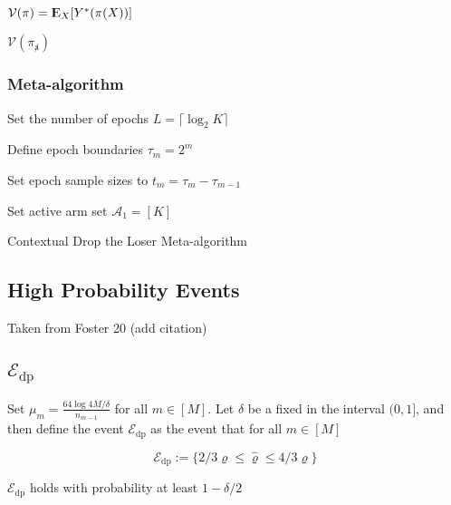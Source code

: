 \documentclass[12pt,,letterpaper,twoside]{report}
\DeclareMathOperator{\E}{{\rm I\kern-.3em E}}
\newcommand{\hpeDP}{{\mathcal{E}_{\mathrm{dp}}}}
\begin{document}
\(\mathcal{V}(\pi) = \E_X[Y^*(\pi(X))]\)

\(\mathcal{V}(\pi_{\not a})\)

\hypertarget{meta-algorithm}{%
\subsubsection{Meta-algorithm}\label{meta-algorithm}}

\begin{algorithm}[H]
\SetAlgoVlined
{}

Set the number of epochs $L = \lceil \log_2{K} \rceil$

Define epoch boundaries $\tau_m = 2^m$

Set epoch sample sizes to $t_m = \tau_m - \tau_{m - 1}$

Set active arm set $\mathcal{A}_1 = [K]$

 \caption{Contextual Drop the Loser Meta-algorithm}
\end{algorithm}

\hypertarget{high-probability-events}{%
\subsection{High Probability Events}\label{high-probability-events}}

Taken from Foster 20 (add citation)

\hypertarget{hpedp}{%
\subsection{\texorpdfstring{\(\hpeDP\)}{\textbackslash hpeDP}}\label{hpedp}}

Set \(\mu_m = \frac{64 \log{4M/\delta}}{n_{m-1}}\) for all
\(m \in [M]\). Let \(\delta\) be a fixed in the interval \((0, 1]\), and
then define the event \(\hpeDP\) as the event that for all \(m \in [M]\)

\[\hpeDP := \{2/3 \varrho \leq \widehat{\varrho} \leq 4/3 \varrho\}\]

\(\hpeDP\) holds with probability at least \(1 - \delta/2\)
\end{document}
